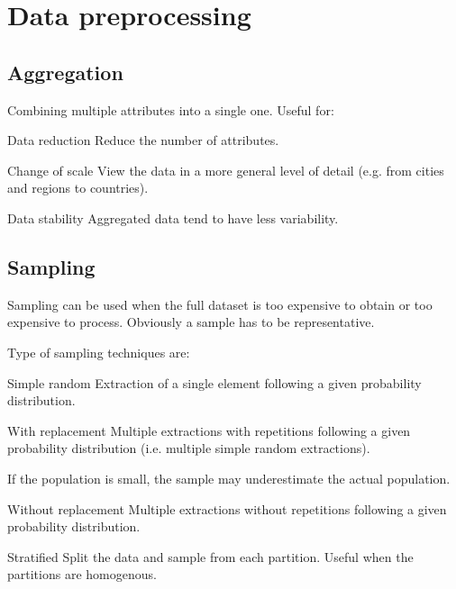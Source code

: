 \chapter{Data preprocessing}

\section{Aggregation}

Combining multiple attributes into a single one.
Useful for:
\begin{descriptionlist}
    \item[Data reduction]
        Reduce the number of attributes.

    \item[Change of scale] 
        View the data in a more general level of detail (e.g. from cities and regions to countries).

    \item[Data stability] 
        Aggregated data tend to have less variability.
\end{descriptionlist}



\section{Sampling}
Sampling can be used when the full dataset is too expensive to obtain or too expensive to process.
Obviously a sample has to be representative.

Type of sampling techniques are:
\begin{descriptionlist}
    \item[Simple random] 
        Extraction of a single element following a given probability distribution.
    
    \item[With replacement] 
        Multiple extractions with repetitions following a given probability distribution
        (i.e. multiple simple random extractions).

        If the population is small, the sample may underestimate the actual population.

    \item[Without replacement] 
        Multiple extractions without repetitions following a given probability distribution.

    \item[Stratified] 
        Split the data and sample from each partition.
        Useful when the partitions are homogenous.
\end{descriptionlist}

